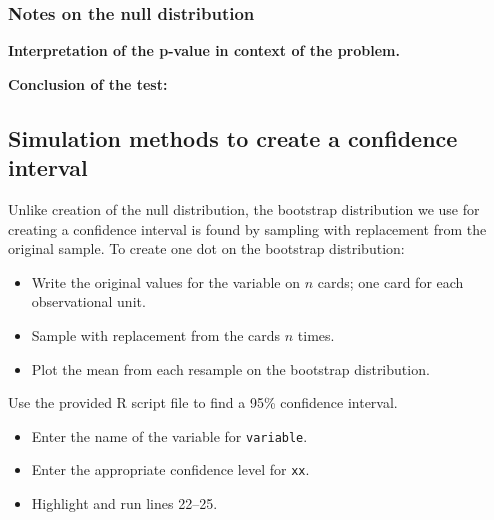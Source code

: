 \documentclass[
]{report}
\newenvironment{Shaded}{\begin{snugshade}}{\end{snugshade}}
\newcommand{\AttributeTok}[1]{\textcolor[rgb]{0.13,0.29,0.53}{#1}}
\newcommand{\CommentTok}[1]{\textcolor[rgb]{0.56,0.35,0.01}{\textit{#1}}}
\newcommand{\DecValTok}[1]{\textcolor[rgb]{0.00,0.00,0.81}{#1}}
\newcommand{\FunctionTok}[1]{\textcolor[rgb]{0.13,0.29,0.53}{\textbf{#1}}}
\newcommand{\NormalTok}[1]{#1}
\newcommand{\SpecialCharTok}[1]{\textcolor[rgb]{0.81,0.36,0.00}{\textbf{#1}}}
\newcommand{\StringTok}[1]{\textcolor[rgb]{0.31,0.60,0.02}{#1}}
\begin{document}
\subsubsection*{Notes on the null distribution}\label{notes-on-the-null-distribution-1}

\vspace{2in}

\textbf{Interpretation of the p-value in context of the problem.}

\vspace{1in}

\textbf{Conclusion of the test:}

\vspace{1in}

\subsection*{Simulation methods to create a confidence interval}\label{simulation-methods-to-create-a-confidence-interval}

Unlike creation of the null distribution, the bootstrap distribution we use for creating a confidence interval is found by sampling with replacement from the original sample. To create one dot on the bootstrap distribution:

\begin{itemize}
\item
  Write the original values for the variable on \(n\) cards; one card for each observational unit.
\item
  Sample with replacement from the cards \(n\) times.
\item
  Plot the mean from each resample on the bootstrap distribution.
\end{itemize}

Use the provided R script file to find a 95\% confidence interval.

\begin{itemize}
\item
  Enter the name of the variable for \texttt{variable}.
\item
  Enter the appropriate confidence level for \texttt{xx}.
\item
  Highlight and run lines 22--25.
\end{itemize}

\begin{Shaded}
\end{Shaded}
\end{document}
